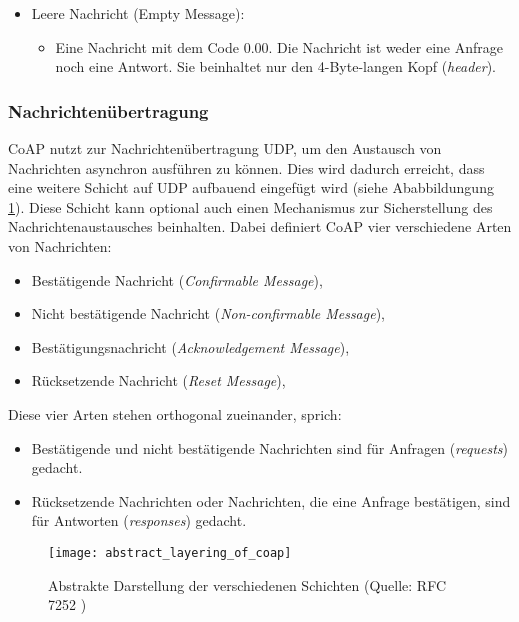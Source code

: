 \begin{itemize}
\begin{itemize}
          \end{itemize}
    \item Leere Nachricht (Empty Message):
          \begin{itemize}
              \item Eine Nachricht mit dem Code 0.00. Die Nachricht ist weder eine Anfrage noch eine Antwort. Sie beinhaltet nur den 4-Byte-langen Kopf (\textit{header}).
          \end{itemize}
\end{itemize}

\subsubsection{Nachrichtenübertragung}
\label{subsubsec:nachrichtenuebertragung}

CoAP nutzt zur Nachrichtenübertragung UDP, um den Austausch von Nachrichten asynchron ausführen zu können. Dies wird dadurch erreicht, dass eine weitere Schicht auf UDP aufbauend eingefügt wird (siehe Ababbildungung \ref{fig:abstrakte-darstellung-der-verschiedenen-schichten}). Diese Schicht kann optional auch einen Mechanismus zur Sicherstellung des Nachrichtenaustausches beinhalten. Dabei definiert CoAP vier verschiedene Arten von Nachrichten:
\begin{itemize}
    \item Bestätigende Nachricht (\textit{Confirmable Message}),
    \item Nicht bestätigende Nachricht (\textit{Non-confirmable Message}),
    \item Bestätigungsnachricht (\textit{Acknowledgement Message}),
    \item Rücksetzende Nachricht (\textit{Reset Message}),
\end{itemize}

Diese vier Arten stehen orthogonal zueinander, sprich:
\begin{itemize}
    \item Bestätigende und nicht bestätigende Nachrichten sind für Anfragen (\textit{requests}) gedacht.
    \item Rücksetzende Nachrichten oder Nachrichten, die eine Anfrage bestätigen, sind für Antworten (\textit{responses}) gedacht.
\end{itemize}

\begin{figure}[h]
    \centering
    \texttt{[image: abstract\_layering\_of\_coap]}
    \caption{Abstrakte Darstellung der verschiedenen Schichten (Quelle: RFC 7252 \autocite{RFC7252})}
    \label{fig:abstrakte-darstellung-der-verschiedenen-schichten}
\end{figure}

